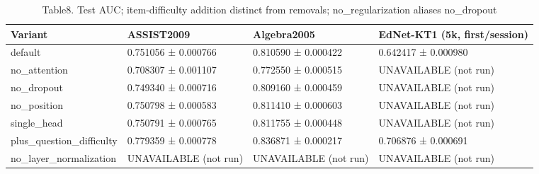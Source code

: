 \begin{table}
\caption{Table8. Test AUC; item-difficulty addition distinct from removals; no_regularization aliases no_dropout}
\begin{tabular}{llll}
\toprule
Variant & ASSIST2009 & Algebra2005 & EdNet-KT1 (5k, first/session) \\
\midrule
default & 0.751056 ± 0.000766 & 0.810590 ± 0.000422 & 0.642417 ± 0.000980 \\
no\_attention & 0.708307 ± 0.001107 & 0.772550 ± 0.000515 & UNAVAILABLE (not run) \\
no\_dropout & 0.749340 ± 0.000716 & 0.809160 ± 0.000459 & UNAVAILABLE (not run) \\
no\_position & 0.750798 ± 0.000583 & 0.811410 ± 0.000603 & UNAVAILABLE (not run) \\
single\_head & 0.750791 ± 0.000765 & 0.811755 ± 0.000448 & UNAVAILABLE (not run) \\
plus\_question\_difficulty & 0.779359 ± 0.000778 & 0.836871 ± 0.000217 & 0.706876 ± 0.000691 \\
no\_layer\_normalization & UNAVAILABLE (not run) & UNAVAILABLE (not run) & UNAVAILABLE (not run) \\
\bottomrule
\end{tabular}
\end{table}
